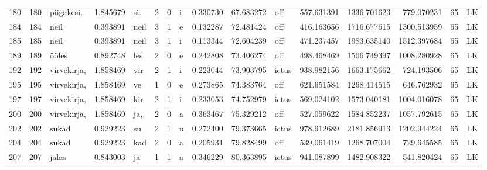 \begin{tabular}{lrlrllllrrlrrrll}
180  &         180 &       piigakesi. &  1.845679 &     si. &        2 &      0 &       i &      0.330730 &     67.683272 &    off &   557.631391 &  1336.701623 &   779.070231 &     65 &        LK \\
184  &         184 &             neil &  0.393891 &    neil &        3 &      1 &       e &      0.132287 &     72.481424 &    off &   416.163656 &  1716.677615 &  1300.513959 &     65 &        LK \\
185  &         185 &             neil &  0.393891 &    neil &        3 &      1 &       i &      0.113344 &     72.604239 &    off &   471.237457 &  1983.635140 &  1512.397684 &     65 &        LK \\
189  &         189 &            ööles &  0.892748 &     les &        2 &      0 &       e &      0.242808 &     73.406274 &    off &   498.468469 &  1506.749397 &  1008.280928 &     65 &        LK \\
192  &         192 &      virvekirja, &  1.858469 &     vir &        2 &      1 &       i &      0.223044 &     73.903795 &  ictus &   938.982156 &  1663.175662 &   724.193506 &     65 &        LK \\
195  &         195 &      virvekirja, &  1.858469 &      ve &        1 &      0 &       e &      0.273865 &     74.383764 &    off &   621.651584 &  1268.414515 &   646.762932 &     65 &        LK \\
197  &         197 &      virvekirja, &  1.858469 &     kir &        2 &      1 &       i &      0.233053 &     74.752979 &  ictus &   569.024102 &  1573.040181 &  1004.016078 &     65 &        LK \\
200  &         200 &      virvekirja, &  1.858469 &     ja, &        2 &      0 &       a &      0.363467 &     75.329212 &    off &   527.059622 &  1584.852237 &  1057.792615 &     65 &        LK \\
202  &         202 &            sukad &  0.929223 &      su &        2 &      1 &       u &      0.272400 &     79.373665 &  ictus &   978.912689 &  2181.856913 &  1202.944224 &     65 &        LK \\
204  &         204 &            sukad &  0.929223 &     kad &        2 &      0 &       a &      0.205931 &     79.828499 &    off &   539.061419 &  1268.707004 &   729.645585 &     65 &        LK \\
207  &         207 &            jalas &  0.843003 &      ja &        1 &      1 &       a &      0.346229 &     80.363895 &  ictus &   941.087899 &  1482.908322 &   541.820424 &     65 &        LK \\

\end{tabular}
